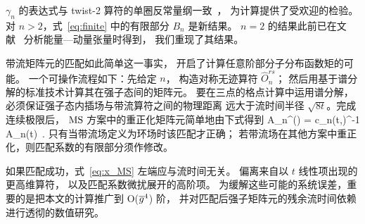 $\gamma_n$ 的表达式与 twist-2 算符的单圈反常量纲一致~\cite{Gross:1974cs}，
为计算提供了受欢迎的检验。
对 $n>2$，式~\eqref{eq:finite} 中的有限部分 $B_n$ 是新结果。
$n=2$ 的结果此前已在文献~\cite{Makino:2014taa} 分析能量—动量张量时得到，
我们重现了其结果。

带流矩阵元的匹配如此简单这一事实，
开启了计算任意阶部分子分布函数矩的可能。
一个可操作流程如下：先给定 $n$，
构造对称无迹算符 $\widehat{O}_n^{rs}$；
然后用基于谱分解的标准技术计算其在强子态间的矩阵元。
要在三点的格点计算中运用谱分解，
必须保证强子态内插场与带流算符之间的物理距离
远大于流时间半径 $\sqrt{8t}$。完成连续极限后，
$\text{MS}$ 方案中的重正化矩阵元简单地由下式得到
\be
A_n^{\MS}(\mu) =
c_n(t,\mu)^{-1} A_n(t) \,.
\label{eq:x_MS}
\ee
只有当带流场定义为环场时该匹配才正确；
若带流场在其他方案中重正化，则匹配系数的有限部分须作修改。

如果匹配成功，式~\eqref{eq:x_MS} 左端应与流时间无关。
偏离来自以 $t$ 线性项出现的更高维算符，
以及匹配系数微扰展开的高阶项。
为缓解这些可能的系统误差，重要的是把本文的计算推广到 O($\overline{g}^4$) 阶，
并对匹配后强子矩阵元的残余流时间依赖进行透彻的数值研究。
